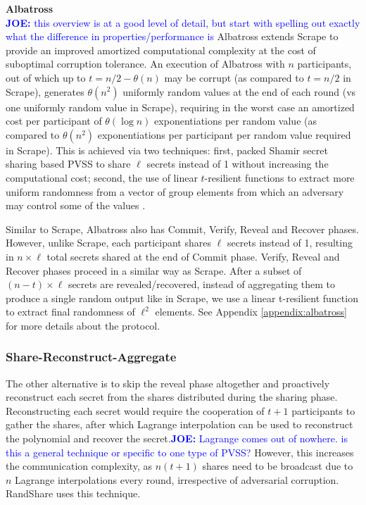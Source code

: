 \documentclass[letterpaper,twocolumn,10pt]{article}
\theoremstyle{definition}
\theoremstyle{remark}
\newcommand{\joenote}[1]{\textcolor{blue}{\textbf{JOE:} #1}}
\begin{document}
\textbf{Albatross}\\

\joenote{this overview is at a good level of detail, but start with spelling out exactly what the difference in properties/performance is}
Albatross extends Scrape to provide an improved amortized computational complexity at the cost of suboptimal corruption tolerance. An execution of Albatross with $n$ participants, out of which up to $t = n/2 - \theta(n)$ may be corrupt (as compared to $t = n/2$ in Scrape), generates $\theta(n^2)$ uniformly random values at the end of each round (vs one uniformly random value in Scrape), requiring in the worst case an amortized cost per participant of $\theta(\log n)$ exponentiations per random value (as compared to $\theta(n^2)$ exponentiations per participant per random value required in Scrape). This is achieved via two techniques: first, packed Shamir secret sharing based PVSS to share $\ell$ secrets instead of 1 without increasing the computational cost; second, the use of linear $t$-resilient functions to extract more uniform randomness from a vector of group elements from which an adversary may control some of the values . 

Similar to Scrape, Albatross also has Commit, Verify, Reveal and Recover phases. However, unlike Scrape, each participant shares $\ell$ secrets instead of 1, resulting in $n \times \ell$ total secrets shared at the end of Commit phase. Verify, Reveal and Recover phases proceed in a similar way as Scrape. After a subset of $(n-t) \times \ell$ secrets are revealed/recovered, instead of aggregating them to produce a single random output like in Scrape, we use a linear t-resilient function to extract final randomness of $\ell^2$ elements. See Appendix \ref{appendix:albatross} for more details about the protocol.\\

\subsubsection{Share-Reconstruct-Aggregate}
The other alternative is to skip the reveal phase altogether and proactively reconstruct each secret from the shares distributed during the sharing phase. Reconstructing each secret would require the cooperation of $t+1$ participants to gather the shares, after which Lagrange interpolation can be used to reconstruct the polynomial and recover the secret.\joenote{Lagrange comes out of nowhere. is this a general technique or specific to one type of PVSS?} However, this increases the communication complexity, as $n (t + 1)$ shares need to be broadcast due to $n$ Lagrange interpolations every round, irrespective of adversarial corruption. RandShare \cite{syta2017scalable} uses this technique.\\
\end{document}
